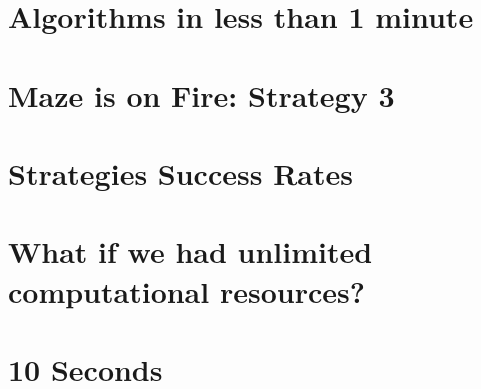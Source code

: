 \documentclass{article}
\begin{document}
\section{Algorithms in less than 1 minute}	

\section{Maze is on Fire: Strategy 3}

\section{Strategies Success Rates}

\section{What if we had unlimited computational resources?}

\section{10 Seconds}





	
\end{document}
